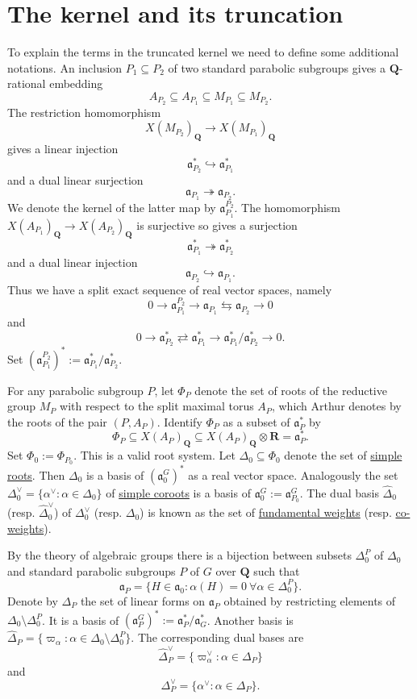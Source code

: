 \documentclass[11pt]{amsart}
\def\Q{\mathbf Q}
\def\R{\mathbf R}
\def\aaa{\mathfrak a}
\def\bs{\setminus}
\def\se{\subseteq}
\theoremstyle{remark}
\begin{document}
\section{The kernel and its truncation}

To explain the terms in the truncated kernel we need to define some additional notations. An inclusion $P_1 \se P_2$ of two standard parabolic subgroups gives a $\Q$-rational embedding
\[ A_{P_2} \se A_{P_1} \se M_{P_1} \se M_{P_2}. \]
The restriction homomorphism 
\[ X(M_{P_2})_{\Q} \to X(M_{P_1})_{\Q} \]
gives a linear injection
\[ \aaa_{P_2}^* \hookrightarrow \aaa_{P_1}^* \]
and a dual linear surjection
\[ \aaa_{P_1} \twoheadrightarrow \aaa_{P_2}. \]
We denote the kernel of the latter map by $\aaa_{P_1}^{P_2}$. The homomorphism $X(A_{P_1})_{\Q} \to X(A_{P_2})_{\Q}$ is surjective so gives a surjection
\[ \aaa_{P_1}^* \twoheadrightarrow \aaa_{P_2}^* \]
and a dual linear injection
\[ \aaa_{P_2} \hookrightarrow \aaa_{P_1}. \]
Thus we have a split exact sequence of real vector spaces, namely
\[ 0 \to \aaa_{P_1}^{P_2} \to \aaa_{P_1} \leftrightarrows \aaa_{P_2} \to 0\]
and 
\[ 0 \to \aaa_{P_2}^* \rightleftarrows \aaa_{P_1}^* \to \aaa_{P_1}^* / \aaa_{P_2}^* \to 0. \]
Set $(\aaa_{P_1}^{P_2})^* := \aaa_{P_1}^* / \aaa_{P_2}^*$. 

For any parabolic subgroup $P$, let $\Phi_P$ denote the set of roots of the reductive group $M_P$ with respect to the split maximal torus $A_P$, which Arthur denotes by the roots of the pair $(P, A_P)$. Identify $\Phi_P$ as a subset of $\aaa_P^*$ by 
\[ \Phi_P \se X(A_P)_\Q \se X(A_P)_\Q \otimes \R = \aaa_P^*. \]
Set $\Phi_0 := \Phi_{P_0}$. This is a valid root system. Let $\Delta_0 \se \Phi_0$ denote the set of \underline{simple roots}. Then $\Delta_0$ is a basis of $(\aaa_0^G)^*$ as a real vector space. Analogously the set $\Delta_0^\vee = \{ \alpha^\vee : \alpha \in \Delta_0\}$ of \underline{simple coroots} is a basis of $\aaa_0^G:= \aaa_{P_0}^G$. The dual basis $\hat\Delta_0$ (resp. $\hat \Delta_0^\vee$) of $\Delta_0^\vee$ (resp. $\Delta_0$) is known as the set of \underline{fundamental weights} (resp. \underline{co-weights}). 

By the theory of algebraic groups there is a bijection between subsets $\Delta_0^P$ of $\Delta_0$ and standard parabolic subgroups $P$ of $G$ over $\Q$ such that 
\[ \aaa_P = \{ H \in \aaa_0 : \alpha(H) = 0 \ \forall \alpha \in \Delta_0^P \}. \]
Denote by $\Delta_P$ the set of linear forms on $\aaa_P$ obtained by restricting elements of $\Delta_0 \bs \Delta_0^P$. It is a basis of $(\aaa_P^G)^* := \aaa_P^* / \aaa_G^*$. Another basis is $\hat\Delta_P = \{ \varpi_\alpha : \alpha \in \Delta_0 \bs \Delta_0^P \}.$ The corresponding dual bases are 
\[ \hat\Delta_P^\vee = \{\varpi_\alpha^\vee : \alpha \in \Delta_P \} \]
and
\[ \Delta_P^\vee = \{ \alpha^\vee : \alpha \in \Delta_P \}. \]
\end{document}
